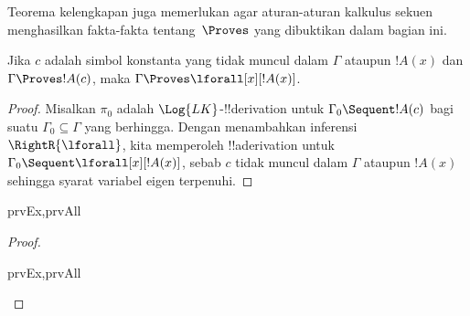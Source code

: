 \documentclass[../../../include/open-logic-section]{subfiles}
\begin{document}

\begin{explain}
  Teorema kelengkapan juga memerlukan agar aturan-aturan kalkulus sekuen
  menghasilkan fakta-fakta tentang~$\Proves$ yang dibuktikan dalam
  bagian ini.
\end{explain}

\begin{thm}
 Jika $c$ adalah simbol konstanta yang
tidak muncul dalam $\Gamma$ ataupun $!A(x)$ dan $\Gamma \Proves !A(c)$,
maka $\Gamma \Proves \lforall[x][!A(x)]$.
\end{thm}

\begin{proof}
Misalkan $\pi_0$ adalah $\Log{LK}$-!!{derivation} untuk
$\Gamma_0 \Sequent !A(c)$ bagi suatu $\Gamma_0 \subseteq \Gamma$ yang
berhingga. Dengan menambahkan inferensi $\RightR{\lforall}$, kita
memperoleh !!a{derivation} untuk
$\Gamma_0 \Sequent \lforall[x][!A(x)]$, sebab $c$ tidak muncul dalam
$\Gamma$ ataupun $!A(x)$ sehingga syarat variabel eigen terpenuhi.
\end{proof}

\begin{prop}
\begin{tagenumerate}{prvEx,prvAll}
\end{tagenumerate}
\end{prop}

\begin{proof}
\begin{tagenumerate}{prvEx,prvAll}
\end{tagenumerate}
\end{proof}
\end{document}
